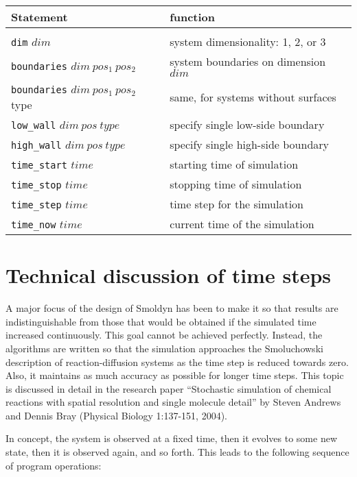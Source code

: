 \documentclass {scrbook}
\newcommand {\ttt} {\texttt}
\begin{document}
\begin{longtable}[c]{ll}
Statement & function\\
\hline\\
\ttt{dim} $dim$ & system dimensionality: 1, 2, or 3\\
\ttt{boundaries} $dim\ pos_1\ pos_2$ & system boundaries on dimension $dim$\\
\ttt{boundaries} $dim\ pos_1\ pos_2$ type & same, for systems without surfaces\\
\ttt{low\_wall} $dim\ pos\ type$ & specify single low-side boundary\\
\ttt{high\_wall} $dim\ pos\ type$ & specify single high-side boundary\\
\ttt{time\_start} $time$ & starting time of simulation\\
\ttt{time\_stop} $time$ & stopping time of simulation\\
\ttt{time\_step} $time$ & time step for the simulation\\
\ttt{time\_now} $time$ & current time of the simulation
\end{longtable}

\section{Technical discussion of time steps}

A major focus of the design of Smoldyn has been to make it so that results are indistinguishable from those that would be obtained if the simulated time increased continuously. This goal cannot be achieved perfectly. Instead, the algorithms are written so that the simulation approaches the Smoluchowski description of reaction-diffusion systems as the time step is reduced towards zero. Also, it maintains as much accuracy as possible for longer time steps. This topic is discussed in detail in the research paper ``Stochastic simulation of chemical reactions with spatial resolution and single molecule detail'' by Steven Andrews and Dennis Bray (Physical Biology 1:137-151, 2004).

In concept, the system is observed at a fixed time, then it evolves to some new state, then it is observed again, and so forth. This leads to the following sequence of program operations:
\end{document}

